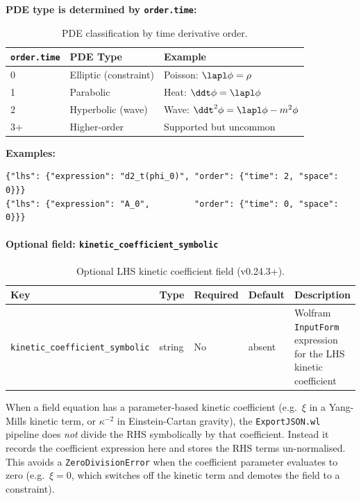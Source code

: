 \textbf{PDE type is determined by \texttt{order.time}:}

\begin{table}[htbp]
\centering
\caption{PDE classification by time derivative order.}
\label{tab:json-pde-type}
\begin{tabular}{@{}lll@{}}
\toprule
\texttt{order.time} & PDE Type & Example \\
\midrule
0 & Elliptic (constraint) & Poisson: $\lapl \phi = \rho$ \\
1 & Parabolic             & Heat: $\ddt \phi = \lapl \phi$ \\
2 & Hyperbolic (wave)     & Wave: $\ddt^2 \phi = \lapl \phi - m^2 \phi$ \\
3+ & Higher-order         & Supported but uncommon \\
\bottomrule
\end{tabular}
\end{table}

\textbf{Examples:}

\begin{lstlisting}[style=json]
{"lhs": {"expression": "d2_t(phi_0)", "order": {"time": 2, "space": 0}}}
{"lhs": {"expression": "A_0",         "order": {"time": 0, "space": 0}}}
\end{lstlisting}

\paragraph{Optional field: \texttt{kinetic\_coefficient\_symbolic}}
\label{sec:json-lhs-kinetic-coeff}

\begin{table}[htbp]
\centering
\caption{Optional LHS kinetic coefficient field (v0.24.3+).}
\label{tab:json-lhs-kinetic}
\begin{tabular}{@{}lllll@{}}
\toprule
Key & Type & Required & Default & Description \\
\midrule
\texttt{kinetic\_coefficient\_symbolic} & string & No & absent & Wolfram \texttt{InputForm} expression for the LHS kinetic coefficient \\
\bottomrule
\end{tabular}
\end{table}

When a field equation has a parameter-based kinetic coefficient (e.g.\ $\xi$ in a
Yang-Mills kinetic term, or $\kappa^{-2}$ in Einstein-Cartan gravity), the
\texttt{ExportJSON.wl} pipeline does \emph{not} divide the RHS symbolically by that
coefficient.  Instead it records the coefficient expression here and stores the RHS
terms un-normalised.  This avoids a \texttt{ZeroDivisionError} when the coefficient
parameter evaluates to zero (e.g.\ $\xi = 0$, which switches off the kinetic term
and demotes the field to a constraint).

